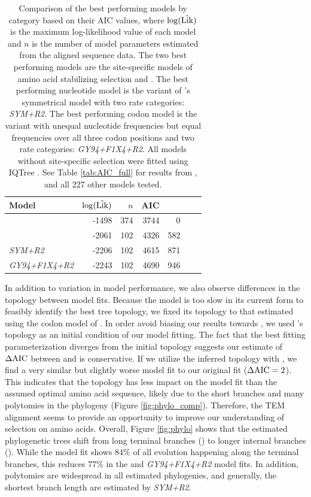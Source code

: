 \documentclass[fleqn,letterpaper]{article}
\begin{document}
\begin{table}
  \centering
  \caption{Comparison of the best performing models by category based on their AIC values, where $\log(\hat{\text{Lik}})$ is the maximum log-likelihood value of each model and $n$ is the number of model parameters estimated from the aligned sequence data.
    The two best performing models are the site-specific models of amino acid stabilizing selection \selac and \phydms.
    The best performing nucleotide model is the variant of \citet{zharkikh1994}'s symmetrical model with two rate categories: \emph{SYM+R2}. 
    The best performing codon model is the \gy variant with unequal nucleotide frequencies but equal frequencies over all three codon positions and two rate categories: \emph{GY94+F1X4+R2}.
    All models without site-specific selection were fitted using IQTree \citep{nguyen2015}.
  See Table \ref{tab:AIC_full} for results from \selac, \phydms and all 227 other models tested.
}  
  \begin{tabular}{lrrrrrr}
    \hline
    Model							& $\log(\hat{\text{Lik}})$ & $n$ & AIC & \DeltaAIC \\ \hline 
    \selac							& -1498 & 374 & 3744 &  0 \\
    \phydms 						& -2061 & 102 & 4326 & 582 \\
    \emph{SYM+R2} 				& -2206 & 102 & 4615 & 871 \\
    \emph{GY94+F1X4+R2} 		& -2243 & 102 & 4690 & 946 \\ \hline
  \end{tabular}
  \label{tab:AIC_selac}
\end{table}


In addition to variation in model performance, we also observe differences in the topology between model fits.
Because the \selac model is too slow in its current form to feasibly identify the best tree topology, we fixed its topology to that estimated using the codon model of \citet{KosiolEtAl07}.
In order avoid biasing our results towards \selac, we used \selac's topology as an initial condition of our \phydms model fitting.
The fact that the best fitting \phydms parameterization diverges from the initial topology suggests our estimate of $\Delta\text{AIC}$ between \selac and \phydms is conservative.
If we utilize the \phydms inferred topology with \selac, we find a very similar but slightly worse model fit to our original \selac fit ($\Delta\text{AIC} = 2$).
This indicates that the topology has less impact on the model fit than the assumed optimal amino acid sequence, likely due to the short branches and many polytomies in the phylogeny (Figure \ref{fig:phylo_comp}).
Therefore, the TEM alignment seems to provide an opportunity to improve our understanding of selection on amino acids.
Overall, Figure \ref{fig:phylo} shows that the estimated phylogenetic trees shift from long terminal branches (\selac) to longer internal branches (\phydms).
While the \selac model fit shows $84 \%$ of all evolution happening along the terminal branches, this reduces $77 \%$ in the \phydms and \emph{GY94+F1X4+R2} model fits.
In addition, polytomies are widespread in all estimated phylogenies, and generally, the shortest branch length are estimated by \emph{SYM+R2}.
\end{document}
